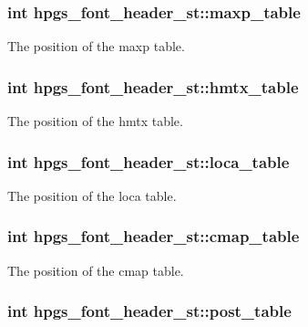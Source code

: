 \subsubsection[maxp\_\-table]{\setlength{\rightskip}{0pt plus 5cm}int {\bf hpgs\_\-font\_\-header\_\-st::maxp\_\-table}}\label{structhpgs__font__header__st_3b6087f86dd4d7b44416244797e29c84}


The position of the maxp table. 
\subsubsection[hmtx\_\-table]{\setlength{\rightskip}{0pt plus 5cm}int {\bf hpgs\_\-font\_\-header\_\-st::hmtx\_\-table}}\label{structhpgs__font__header__st_5b6510174b7573a836323b837c36af65}


The position of the hmtx table. 
\subsubsection[loca\_\-table]{\setlength{\rightskip}{0pt plus 5cm}int {\bf hpgs\_\-font\_\-header\_\-st::loca\_\-table}}\label{structhpgs__font__header__st_08577d0c6d7f3565618c3632996c4073}


The position of the loca table. 
\subsubsection[cmap\_\-table]{\setlength{\rightskip}{0pt plus 5cm}int {\bf hpgs\_\-font\_\-header\_\-st::cmap\_\-table}}\label{structhpgs__font__header__st_dee2605275470c5e8aa5b5a1a7540afd}


The position of the cmap table. 
\subsubsection[post\_\-table]{\setlength{\rightskip}{0pt plus 5cm}int {\bf hpgs\_\-font\_\-header\_\-st::post\_\-table}}\label{structhpgs__font__header__st_d063ab4b87fe74878f0effba5bd4edf3}


